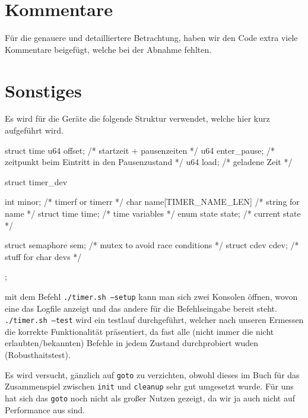 \documentclass[
   draft=false
  ,paper=a4
  ,twoside=false
  ,fontsize=11pt
  ,headsepline
  ,BCOR10mm
  ,DIV11
  ,parskip=full+
]{scrartcl} %
\begin{document}
\section{Kommentare}
Für die genauere und detailliertere Betrachtung, haben wir den Code extra 
viele Kommentare beigefügt, welche bei der Abnahme fehlten.


\section{Sonstiges}

Es wird für die Geräte die folgende Struktur verwendet, welche hier kurz
aufgeführt wird.
\begin{ccode}
struct time {
    u64 offset;   /* startzeit + pausenzeiten */
    u64 enter_pause; /* zeitpunkt beim Eintritt in den Pausenzustand */
    u64 load;       /* geladene Zeit */
}

struct timer_dev {
    int minor;              /* timerf or timerr */
    char name[TIMER_NAME_LEN]  /* string for name */
    struct time time;       /* time variables */
    enum state state; /* current state */

    struct semaphore sem;   /* mutex to avoid race conditions */
    struct cdev cdev;       /* stuff for char devs */
};

\end{ccode}
mit dem Befehl \texttt{./timer.sh --setup} kann man sich zwei Konsolen öffnen,
wovon eine das Logfile anzeigt und das andere für die Befehlseingabe bereit
steht.  \texttt{./timer.sh --test} wird ein testlauf durchgeführt, welcher 
nach unseren Ermessen die korrekte Funktionalität präsentiert, da fast alle 
(nicht immer die nicht erlaubten/bekannten) Befehle in jedem Zustand 
durchprobiert wuden (Robusthaitstest).

Es wird versucht, gänzlich auf \texttt{goto} zu verzichten, obwohl dieses im
Buch für das Zusammenspiel zwischen \texttt{init} und \texttt{cleanup} sehr
gut umgesetzt wurde. Für uns hat sich das \texttt{goto} noch nicht als großer
Nutzen gezeigt, da wir ja auch nicht auf Performance aus sind.
\end{document}
